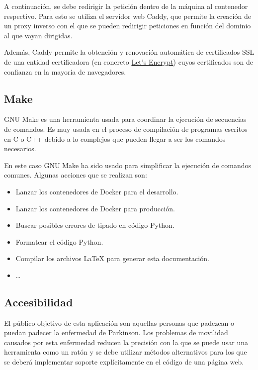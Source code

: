 A continuación, se debe redirigir la petición dentro de la máquina al contenedor
respectivo. Para esto se utiliza el servidor web Caddy, que permite la creación
de un proxy inverso con el que se pueden redirigir peticiones en función del
dominio al que vayan dirigidas.

Además, Caddy permite la obtención y renovación automática de certificados SSL
de una entidad certificadora (en concreto \href{https://letsencrypt.org/}{Let's
Encrypt}) cuyos certificados son de confianza en la mayoría de navegadores.

\subsection{Make}

GNU Make es una herramienta usada para coordinar la ejecución de secuencias de
comandos. Es muy usada en el proceso de compilación de programas escritos en C o
C++ debido a lo complejos que pueden llegar a ser los comandos necesarios.

En este caso GNU Make ha sido usado para simplificar la ejecución de comandos
comunes. Algunas acciones que se realizan son:

\begin{itemize}
    \item Lanzar los contenedores de Docker para el desarrollo.
    \item Lanzar los contenedores de Docker para producción.
    \item Buscar posibles errores de tipado en código Python.
    \item Formatear el código Python.
    \item Compilar los archivos \LaTeX{} para generar esta documentación.
    \item \dots
\end{itemize}

\subsection{Accesibilidad}

El público objetivo de esta aplicación son aquellas personas que padezcan o
puedan padecer la enfermedad de Parkinson. Los problemas de movilidad causados
por esta enfermedad reducen la precisión con la que se puede usar una
herramienta como un ratón y se debe utilizar métodos alternativos para los que
se deberá implementar soporte explícitamente en el código de una página web.

